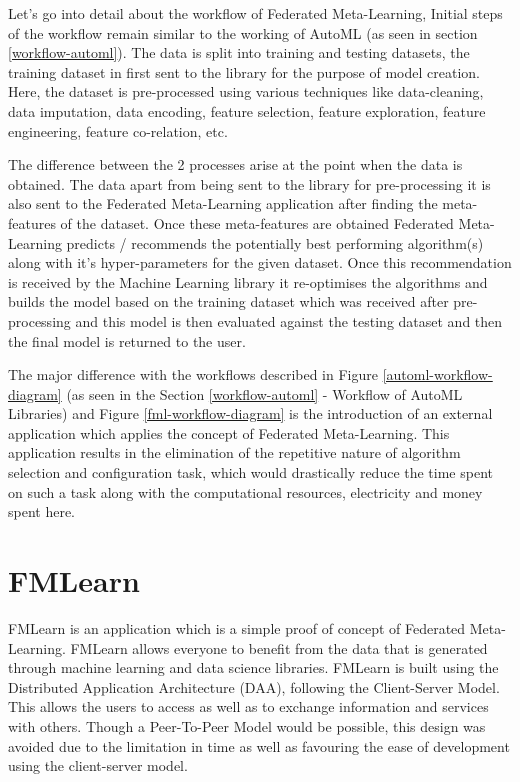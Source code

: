 Let's go into detail about the workflow of Federated Meta-Learning, Initial steps of the workflow remain similar to the working of AutoML (as seen in section \ref{workflow-automl}). The data is split into training and testing datasets, the training dataset in first sent to the library for the purpose of model creation. Here, the dataset is pre-processed using various techniques like data-cleaning, data imputation, data encoding, feature selection, feature exploration, feature engineering, feature co-relation, etc.

The difference between the 2 processes arise at the point when the data is obtained. The data apart from being sent to the library for pre-processing it is also sent to the Federated Meta-Learning application after finding the meta-features of the dataset. Once these meta-features are obtained Federated Meta-Learning predicts / recommends the potentially best performing algorithm(s) along with it's hyper-parameters for the given dataset. Once this recommendation is received by the Machine Learning library it re-optimises the algorithms and builds the model based on the training dataset which was received after pre-processing and this model is then evaluated against the testing dataset and then the final model is returned to the user.

The major difference with the workflows described in Figure \ref{automl-workflow-diagram} (as seen in the Section \ref{workflow-automl} - Workflow of AutoML Libraries) and Figure \ref{fml-workflow-diagram} is the introduction of an external application which applies the concept of Federated Meta-Learning. This application results in the elimination of the repetitive nature of algorithm selection and configuration task, which would drastically reduce the time spent on such a task along with the computational resources, electricity and money spent here.

\section{FMLearn}
\label{fmlearn}

FMLearn is an application which is a simple proof of concept of Federated Meta-Learning. FMLearn allows everyone to benefit from the data that is generated through machine learning and data science libraries. FMLearn is built using the Distributed Application Architecture (DAA), following the Client-Server Model. This allows the users to access as well as to exchange information and services with others. Though a Peer-To-Peer Model would be possible, this design was avoided due to the limitation in time as well as favouring the ease of development using the client-server model.

